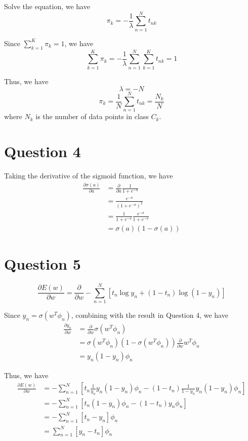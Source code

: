 \documentclass[a4paper,12pt]{article}
\newcommand{\pard}[2]{\frac{\partial #1}{\partial #2}}
\begin{document}
Solve the equation, we have
\begin{equation*}
	\pi_k = -\frac{1}{\lambda} \sum_{n=1}^N t_{nk}
\end{equation*}

Since $\sum_{k=1}^K \pi_k = 1$, we have
\begin{equation*}
	\sum_{k=1}^K \pi_k = -\frac{1}{\lambda} \sum_{n=1}^N \sum_{k=1}^K t_{nk} = 1
\end{equation*}

Thus, we have
\begin{equation*}
	\lambda = -N
\end{equation*}
\begin{equation*}
	\pi_k = \frac{1}{N} \sum_{n=1}^N t_{nk} = \frac{N_k}{N}
\end{equation*}
where $N_k$ is the number of data points in class $C_k$.

\section*{Question 4}

Taking the derivative of the sigmoid function, we have
\begin{align*}
	\pard{\sigma(a)}{a} &= \pard{}{a} \frac{1}{1 + e^{-a}} \\
	&= \frac{e^{-a}}{(1 + e^{-a})^2} \\
	&= \frac{1}{1 + e^{-a}} \frac{e^{-a}}{1 + e^{-a}} \\
	&= \sigma(a) (1 - \sigma(a))
\end{align*}

\section*{Question 5}

\begin{equation*}
	\pard{E(w)}{w} = \pard{}{w} - \sum_{n=1}^N \left[t_n \log y_n + (1 - t_n) \log (1 - y_n)\right]
\end{equation*}

Since $y_n = \sigma(w^T \phi_n)$, combining with the result in Question 4, we have
\begin{align*}
	\pard{y_n}{w} &= \pard{}{w} \sigma(w^T \phi_n) \\
	&= \sigma(w^T \phi_n) (1 - \sigma(w^T \phi_n)) \pard{}{w} w^T \phi_n \\
	&= y_n (1 - y_n) \phi_n
\end{align*}

Thus, we have
\begin{align*}
	\pard{E(w)}{w} &= - \sum_{n=1}^N \left[t_n \frac{1}{y_n} y_n (1 - y_n) \phi_n - (1 - t_n) \frac{1}{1 - y_n} y_n (1 - y_n) \phi_n\right] \\
	&= - \sum_{n=1}^N \left[t_n (1 - y_n) \phi_n - (1 - t_n) y_n \phi_n\right] \\
	&= - \sum_{n=1}^N \left[t_n - y_n\right] \phi_n \\
	&= \sum_{n=1}^N \left[y_n - t_n\right] \phi_n
\end{align*}
\end{document}
